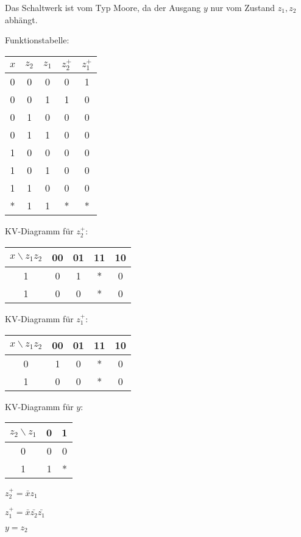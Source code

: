 \documentclass{exercisesheet}
\begin{document}
\begin{solutions}
  \item Das Schaltwerk ist vom Typ Moore, da der Ausgang $y$ nur vom Zustand $z_1, z_2$ abhängt.
  \item Funktionstabelle:
  \begin{tabular}{ccc|cc}
    $x$ & $z_2$ & $z_1$ & $z_2^+$ & $z_1^+$ \\
    \hline
    0   & 0     & 0     & 0       & 1       \\
    0   & 0     & 1     & 1       & 0       \\
    0   & 1     & 0     & 0       & 0       \\
    0   & 1     & 1     & 0       & 0       \\
    1   & 0     & 0     & 0       & 0       \\
    1   & 0     & 1     & 0       & 0       \\
    1   & 1     & 0     & 0       & 0       \\
    *   & 1     & 1     & *       & *       \\
  \end{tabular}

  KV-Diagramm für $z_2^+$:
  \begin{tabular}{c|cccc}
    $x\backslash z_1z_2$ & 00 & 01 & 11 & 10 \\
    \hline
    1                    & 0  & 1  & *  & 0  \\
    1                    & 0  & 0  & *  & 0  \\
  \end{tabular}

  KV-Diagramm für $z_1^+$:
  \begin{tabular}{c|cccc}
    $x\backslash z_1z_2$ & 00 & 01 & 11 & 10 \\
    \hline
    0                    & 1  & 0  & *  & 0  \\
    1                    & 0  & 0  & *  & 0  \\
  \end{tabular}

  KV-Diagramm für $y$:
  \begin{tabular}{c|cc}
    $z_2\backslash z_1$ & 0 & 1 \\
    \hline
    0                   & 0 & 0 \\
    1                   & 1 & * \\
  \end{tabular}
  \item
  $z_2^+ = \bar x z_1$\par
  $z_1^+ = \bar x \bar{z_2} \bar{z_1}$\par
  $y = z_2$
\end{solutions}
\end{document}
